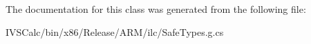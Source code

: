 The documentation for this class was generated from the following file\+:\begin{DoxyCompactItemize}
\item 
I\+V\+S\+Calc/bin/x86/\+Release/\+A\+R\+M/ilc/Safe\+Types.\+g.\+cs\end{DoxyCompactItemize}

